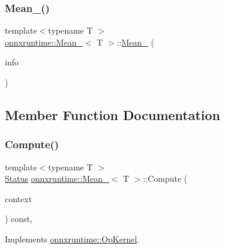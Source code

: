 \subsubsection{\texorpdfstring{Mean\+\_()}{Mean\_8()}}
{\footnotesize\ttfamily template$<$typename T $>$ \\
\mbox{\hyperlink{classonnxruntime_1_1Mean__8}{onnxruntime\+::\+Mean\+\_}}$<$ T $>$\+::\mbox{\hyperlink{classonnxruntime_1_1Mean__8}{Mean\+\_}} (\begin{DoxyParamCaption}\item[{const \mbox{\hyperlink{classonnxruntime_1_1OpKernelInfo}{Op\+Kernel\+Info}} \&}]{info }\end{DoxyParamCaption})\hspace{0.3cm}{\ttfamily [inline]}}



\subsection{Member Function Documentation}
\mbox{\label{classonnxruntime_1_1Mean__8_a18115785b41a8fe635792587d06b8658}} 
\subsubsection{\texorpdfstring{Compute()}{Compute()}\hspace{0.1cm}{\footnotesize\ttfamily [1/2]}}
{\footnotesize\ttfamily template$<$typename T $>$ \\
\mbox{\hyperlink{classonnxruntime_1_1common_1_1Status}{Status}} \mbox{\hyperlink{classonnxruntime_1_1Mean__8}{onnxruntime\+::\+Mean\+\_}}$<$ T $>$\+::Compute (\begin{DoxyParamCaption}\item[{\mbox{\hyperlink{classonnxruntime_1_1OpKernelContext}{Op\+Kernel\+Context}} $\ast$}]{context }\end{DoxyParamCaption}) const\hspace{0.3cm}{\ttfamily [override]}, {\ttfamily [virtual]}}



Implements \mbox{\hyperlink{classonnxruntime_1_1OpKernel_a9eca8656a78b1b3ab9d3351a12798650}{onnxruntime\+::\+Op\+Kernel}}.

\mbox{\label{classonnxruntime_1_1Mean__8_a74e7ff61abf552d8029741dedc2981e5}} 
